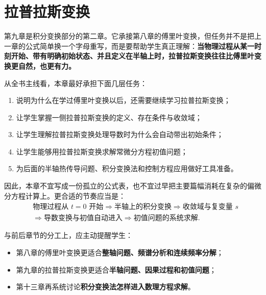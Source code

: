 
\chapter{拉普拉斯变换}

\begin{wulibj}[本章定位]
第九章是积分变换部分的第二章。它承接第八章的傅里叶变换，但任务并不是把上一章的公式简单换一个字母重写，而是要帮助学生真正理解：\textbf{当物理过程从某一时刻开始、带有明确初始状态、并且定义在半轴上时，拉普拉斯变换往往比傅里叶变换更自然，也更有力。}

从全书主线看，本章最好承担下面几层任务：
\begin{enumerate}
    \item 说明为什么在学过傅里叶变换以后，还需要继续学习拉普拉斯变换；
    \item 让学生掌握一侧拉普拉斯变换的定义、存在条件与收敛域；
    \item 让学生理解拉普拉斯变换处理导数时为什么会自动带出初始条件；
    \item 让学生能够用拉普拉斯变换求解常微分方程初值问题；
    \item 为后面的半轴热传导问题、积分变换法和控制方程应用做好工具准备。
\end{enumerate}

因此，本章不宜写成一份孤立的公式表，也不宜过早把主要篇幅消耗在复杂的偏微分方程计算上。更合适的节奏应当是：
\[
    \begin{aligned}
        &\text{物理过程从 } t=0 \text{ 开始}
        \Longrightarrow
        \text{半轴上的积分变换}
        \Longrightarrow
        \text{收敛域与复变量 } s \\
        &\Longrightarrow
        \text{导数变换与初值自动进入}
        \Longrightarrow
        \text{初值问题的系统求解}.
    \end{aligned}
\]

与前后章节的分工上，应主动提醒学生：
\begin{itemize}
    \item 第八章的傅里叶变换更适合\textbf{整轴问题、频谱分析和连续频率分解}；
    \item 第九章的拉普拉斯变换更适合\textbf{半轴问题、因果过程和初值问题}；
    \item 第十三章再系统讨论\textbf{积分变换法怎样进入数理方程求解}。
\end{itemize}
\end{wulibj}

